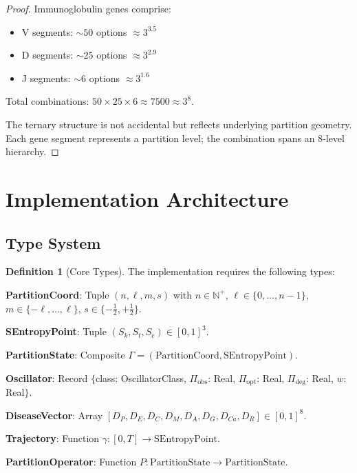 \documentclass[10pt,twocolumn]{article}
\theoremstyle{plain}
\theoremstyle{definition}
\newtheorem{definition}[theorem]{Definition}
\theoremstyle{remark}
\newcommand{\N}{\mathbb{N}}
\newcommand{\Sk}{S_k}
\newcommand{\St}{S_t}
\newcommand{\Se}{S_e}
\newcommand{\Gstate}{\Gamma}
\newcommand{\Pop}{P}
\begin{document}
\begin{proof}
Immunoglobulin genes comprise:
\begin{itemize}
\item V segments: $\sim 50$ options $\approx 3^{3.5}$
\item D segments: $\sim 25$ options $\approx 3^{2.9}$
\item J segments: $\sim 6$ options $\approx 3^{1.6}$
\end{itemize}
Total combinations: $50 \times 25 \times 6 \approx 7500 \approx 3^8$.

The ternary structure is not accidental but reflects underlying partition geometry. Each gene segment represents a partition level; the combination spans an 8-level hierarchy.
\end{proof}

\section{Implementation Architecture}
\label{sec:implementation}

\subsection{Type System}

\begin{definition}[Core Types]
\label{def:types}
The implementation requires the following types:

\textbf{PartitionCoord}: Tuple $(n, \ell, m, s)$ with $n \in \N^+$, $\ell \in \{0,\ldots,n-1\}$, $m \in \{-\ell,\ldots,\ell\}$, $s \in \{-\frac{1}{2}, +\frac{1}{2}\}$.

\textbf{SEntropyPoint}: Tuple $(\Sk, \St, \Se) \in [0,1]^3$.

\textbf{PartitionState}: Composite $\Gstate = (\text{PartitionCoord}, \text{SEntropyPoint})$.

\textbf{Oscillator}: Record $\{$class: OscillatorClass, $\Pi_{\mathrm{obs}}$: Real, $\Pi_{\mathrm{opt}}$: Real, $\Pi_{\mathrm{deg}}$: Real, $w$: Real$\}$.

\textbf{DiseaseVector}: Array $[D_P, D_E, D_C, D_M, D_A, D_G, D_{Ca}, D_R] \in [0,1]^8$.

\textbf{Trajectory}: Function $\gamma: [0,T] \to \text{SEntropyPoint}$.

\textbf{PartitionOperator}: Function $\Pop: \text{PartitionState} \to \text{PartitionState}$.
\end{definition}
\end{document}

